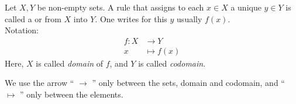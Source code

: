 

\begin{Definition}%
Let $X,Y$ be non-empty sets. A rule 
that assigns to 
each  $x\in X$ a unique  $y\in Y$
is called a  or 
from $X$ into $Y$. One writes for this $y$ usually $f(x)$.\\[0.5em]
Notation:\\[-2em]
\begin{align*}
f:X &\rightarrow Y \\
x &\mapsto f(x)
\end{align*}
Here, $X$ is called \emph{domain} of $f$, and $Y$ is called \emph{codomain}. 
\end{Definition} 

\begin{Attention}
We use the arrow `` $\to$ '' only between the sets, domain and codomain,
and `` $\mapsto$ '' only between the elements.
\end{Attention}

